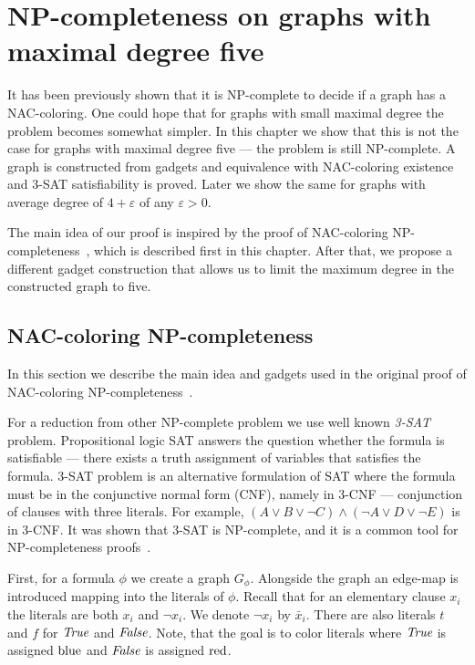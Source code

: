 \chapter{NP-completeness on graphs with maximal degree five}%
\label{chapter:np}

\begin{chapterabstract}

	It has been previously shown that it is NP-complete to decide
	if a graph has a NAC-coloring.
	One could hope that for graphs with small maximal degree
	the problem becomes somewhat simpler.
	In this chapter we show that this is not the case
	for graphs with maximal degree five --- the problem is still NP-complete.
	A graph is constructed from gadgets and equivalence
	with NAC-coloring existence and 3-SAT satisfiability is proved.
	Later we show the same for graphs with average degree of
	$4+\varepsilon$ of any $\varepsilon > 0$.

\end{chapterabstract}

The main idea of our proof is inspired by
the proof of NAC-coloring NP-completeness~\cite{np_complete},
which is described first in this chapter.
After that, we propose a different gadget construction
that allows us to limit the maximum
degree in the constructed graph to five.

\section{NAC-coloring NP-completeness}

In this section we describe the main idea and gadgets used
in the original proof of NAC-coloring NP-completeness~\cite{np_complete}.

For a reduction from other NP-complete problem
we use well known \emph{3-SAT} problem.
Propositional logic SAT answers the question
whether the formula is satisfiable ---
there exists a truth assignment of variables that satisfies the formula.
3-SAT problem is an alternative formulation of SAT
where the formula must be in the conjunctive normal form (CNF), namely in 3-CNF
--- conjunction of clauses with three literals.
For example, \( (A \lor B \lor \lnot C) \land (\lnot A \lor D \lor \lnot E) \)
is in 3-CNF\@.
It was shown that 3-SAT is NP-complete,
and it is a common tool for NP-completeness proofs~\cite{3-sat}.

First, for a formula \( \phi \) we create a graph \( G_\phi \).
Alongside the graph an edge-map is introduced mapping into the literals
of \( \phi \). Recall that for an elementary clause \( x_i \) the literals
are both \( x_i \) and \( \neg x_i \). We denote \( \lnot x_i \) by \( \bar{x}_i \).
There are also literals \( t \) and \( f \) for \( \textit{True} \) and \( \textit{False} \).
Note, that the goal is to color literals where \( \textit{True} \) is assigned \( \text{blue} \)
and \( \textit{False} \) is assigned \( \text{red} \).

